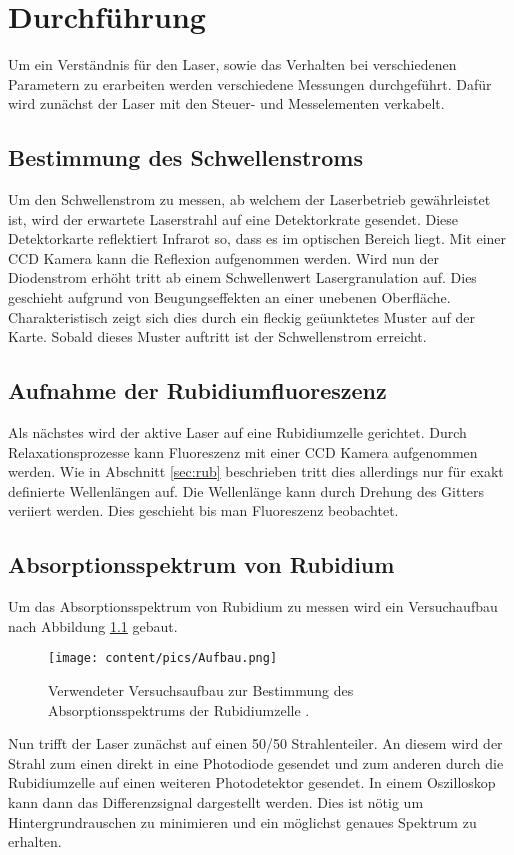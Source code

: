 \chapter{Durchführung}
\label{cha:Durchführung}
Um ein Verständnis für den Laser, sowie das Verhalten bei verschiedenen Parametern zu erarbeiten werden verschiedene Messungen durchgeführt. Dafür wird zunächst der Laser mit den 
Steuer- und Messelementen verkabelt.

\section{Bestimmung des Schwellenstroms}
\label{sec:schwelle}

Um den Schwellenstrom zu messen, ab welchem der Laserbetrieb gewährleistet ist, wird der erwartete Laserstrahl auf eine Detektorkrate gesendet. Diese Detektorkarte reflektiert 
Infrarot so, dass es im optischen Bereich liegt. Mit einer CCD Kamera kann die Reflexion aufgenommen werden. Wird nun der Diodenstrom erhöht tritt ab einem Schwellenwert
Lasergranulation auf. Dies geschieht aufgrund von Beugungseffekten an einer unebenen Oberfläche. Charakteristisch zeigt sich dies durch ein fleckig geüunktetes Muster auf der Karte. 
Sobald dieses Muster auftritt ist der Schwellenstrom erreicht. 

\section{Aufnahme der Rubidiumfluoreszenz}
\label{sec:fluoreszenz}

Als nächstes wird der aktive Laser auf eine Rubidiumzelle gerichtet. Durch Relaxationsprozesse kann Fluoreszenz mit einer CCD Kamera aufgenommen werden. Wie in Abschnitt \ref{sec:rub}
beschrieben tritt dies allerdings nur für exakt definierte Wellenlängen auf. Die Wellenlänge kann durch Drehung des Gitters veriiert werden. Dies geschieht bis man Fluoreszenz beobachtet.

\section{Absorptionsspektrum von Rubidium}
\label{sec:abso_rub}

Um das Absorptionsspektrum von Rubidium zu messen wird ein Versuchaufbau nach Abbildung \ref{fig:Aufbau_rub} gebaut.

\begin{figure}
    \centering
    \texttt{[image: content/pics/Aufbau.png]}
    \caption{Verwendeter Versuchsaufbau zur Bestimmung des Absorptionsspektrums der Rubidiumzelle \cite{diode_laser_spectroscopy}.}
    \label{fig:Aufbau_rub}
\end{figure}

Nun trifft der Laser zunächst auf einen 50/50 Strahlenteiler. An diesem wird der Strahl zum einen direkt in eine Photodiode gesendet und zum anderen durch die Rubidiumzelle auf einen 
weiteren Photodetektor gesendet. In einem Oszilloskop kann dann das Differenzsignal dargestellt werden. Dies ist nötig um Hintergrundrauschen zu minimieren und ein möglichst 
genaues Spektrum zu erhalten. 
